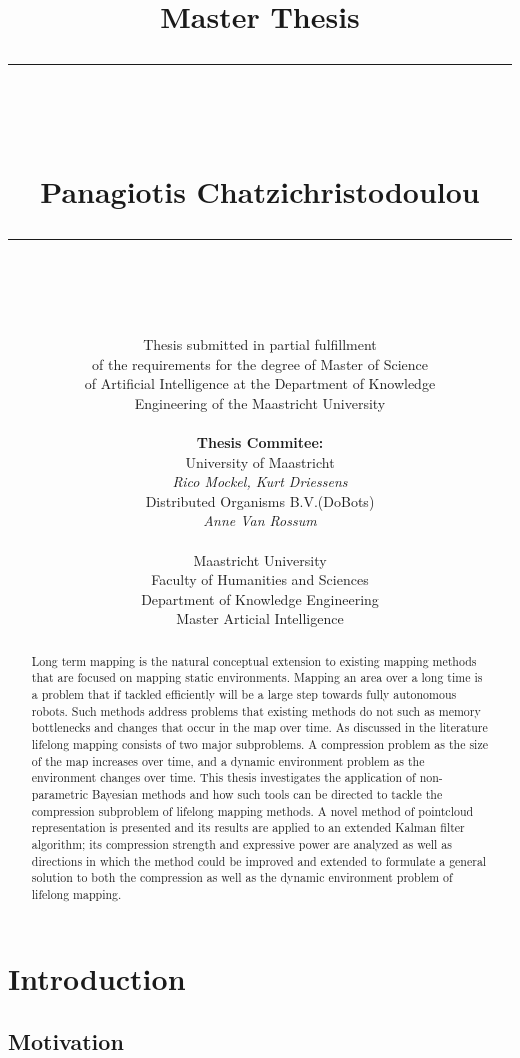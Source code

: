 \documentclass[twoside,hidelinks]{article}
\title{
\Huge{Master Thesis} \\
\noindent\rule{4cm}{0.4pt} \\
\vspace{5mm}
\huge{\selectfont{Towards lifelong mapping in pointclouds}}
\vspace{5mm} \\
\normalsize Panagiotis Chatzichristodoulou \\
\noindent\rule{4cm}{0.4pt} \\
\vspace{5mm}
\fontsize{24pt}{10pt}{Master Thesis DKE 09-16 }} %
\author{
\normalsize Thesis submitted in partial fulfillment\\
\normalsize  of the requirements for the degree of Master of Science \\
\normalsize of Artificial Intelligence at the Department of Knowledge \\
\normalsize  Engineering of the Maastricht University \\
\vspace{5mm} \\
\normalsize \textbf{Thesis Commitee:} \\ 
\normalsize University of Maastricht \\ %
\normalsize \textit{Rico Mockel, Kurt Driessens} \\
\normalsize Distributed Organisms B.V.(DoBots)\\
\normalsize \textit{Anne Van Rossum} \\
\vspace{0mm} \\
\normalsize Maastricht University \\
\normalsize Faculty of Humanities and Sciences \\ 
\normalsize Department of Knowledge Engineering \\
\normalsize Master Articial Intelligence \\
}
\begin{document}
\maketitle %

\thispagestyle{fancy} %

\newpage
\begin{abstract}

\noindent Long term mapping is the natural conceptual extension to existing mapping methods that are focused on mapping static environments. Mapping an area over a long time is a problem that if tackled efficiently will be a large step towards fully autonomous robots. Such methods address problems that existing methods do not such as memory bottlenecks and changes that occur in the map over time. As discussed in the literature lifelong mapping consists of two major subproblems. A compression problem as the size of the map increases over time, and a dynamic environment problem as the environment changes over time. This thesis investigates the application of non-parametric Bayesian methods and how such tools can be directed to tackle the compression subproblem of lifelong mapping methods. A novel method of pointcloud representation is presented and its results are applied to an extended Kalman filter algorithm; its compression strength and expressive power are analyzed as well as directions in which the method could be improved and extended to formulate a general solution to both the compression as well as the dynamic environment problem of lifelong mapping.


\end{abstract}

 
\tableofcontents
\listoffigures
 
 

\newpage


\section{Introduction}
\label{sec:Intro}

\subsection{Motivation}
\end{document}
